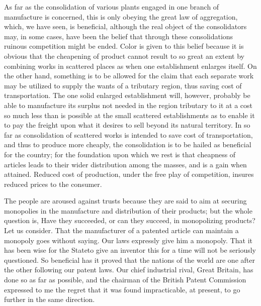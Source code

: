 \documentclass[11pt,openany]{book}
\begin{document}
As far as the consolidation of various plants engaged in one branch of manufacture is concerned, this is only obeying the great law of aggregation, which, we have seen, is beneficial, although the real object of the consolidators may, in some cases, have been the belief that through these consolidations ruinous competition might be ended. Color is given to this belief because it is obvious that the cheapening of product cannot result to so great an extent by combining works in scattered places as when one establishment enlarges itself. On the other hand, something is to be allowed for the claim that each separate work may be utilized to supply the wants of a tributary region, thus saving cost of transportation. The one solid enlarged establishment will, however, probably be able to manufacture its surplus not needed in the region tributary to it at a cost so much less than is possible at the small scattered establishments as to enable it to pay the freight upon what it desires to sell beyond its natural territory. In so far as consolidation of scattered works is intended to save cost of transportation, and thus to produce more cheaply, the consolidation is to be hailed as beneficial for the country; for the foundation upon which we rest is that cheapness of articles leads to their wider distribution among the masses, and is a gain when attained. Reduced cost of production, under the free play of competition, insures reduced prices to the consumer.

The people are aroused against trusts because they are said to aim at securing monopolies in the manufacture and distribution of their products; but the whole question is, Have they succeeded, or can they succeed, in monopolizing products? Let us consider. That the manufacturer of a patented article can maintain a monopoly goes without saying. Our laws expressly give him a monopoly. That it has been wise for the Stateto give an inventor this for a time will not be seriously questioned. So beneficial has it proved that the nations of the world are one after the other following our patent laws. Our chief industrial rival, Great Britain, has done so as far as possible, and the chairman of the British Patent Commission expressed to me the regret that it was found impracticable, at present, to go further in the same direction.
\end{document}
